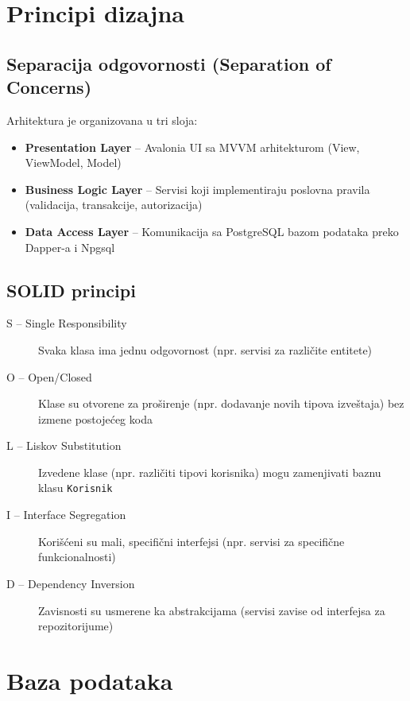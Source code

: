 \section{Principi dizajna}

\subsection{Separacija odgovornosti (Separation of Concerns)}

Arhitektura je organizovana u tri sloja:

\begin{itemize}
    \item \textbf{Presentation Layer} – Avalonia UI sa MVVM arhitekturom (View, ViewModel, Model)
    \item \textbf{Business Logic Layer} – Servisi koji implementiraju poslovna pravila (validacija, transakcije, autorizacija)
    \item \textbf{Data Access Layer} – Komunikacija sa PostgreSQL bazom podataka preko Dapper-a i Npgsql
\end{itemize}

\subsection{SOLID principi}

\begin{description}
    \item[S – Single Responsibility] Svaka klasa ima jednu odgovornost (npr. servisi za različite entitete)
    \item[O – Open/Closed] Klase su otvorene za proširenje (npr. dodavanje novih tipova izveštaja) bez izmene postojećeg koda
    \item[L – Liskov Substitution] Izvedene klase (npr. različiti tipovi korisnika) mogu zamenjivati baznu klasu \texttt{Korisnik}
    \item[I – Interface Segregation] Korišćeni su mali, specifični interfejsi (npr. servisi za specifične funkcionalnosti)
    \item[D – Dependency Inversion] Zavisnosti su usmerene ka abstrakcijama (servisi zavise od interfejsa za repozitorijume)
\end{description}

\section{Baza podataka}

